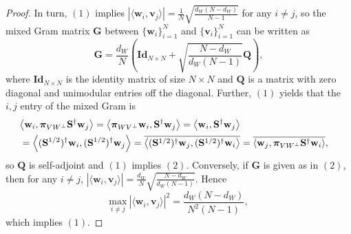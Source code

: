 \documentclass[10pt,a4paper]{amsart}
\newcommand{\bQ}{{\mathbf Q}}
\newcommand{\bS}{{\mathbf S}}
\newcommand{\bpi}{{\boldsymbol{\pi}}}
\newcommand{\bw}{{\mathbf w}}
\newcommand{\ip}[2]{\left\langle#1,#2\right\rangle}
\begin{document}
\begin{proof}
In turn, $(1)$ implies $|\langle \mathbf{w}_i, \mathbf{v}_j \rangle| =  \frac{1}{N}\sqrt{\frac{d_W(N-d_W)}{N-1}}$ for any $i \neq j$, so the mixed Gram matrix $\mathbf{G}$ between $\{\mathbf{w}_i\}_{i=1}^N$ and $\{\mathbf{v}_i\}_{i=1}^N$ can be written as 
    \begin{equation*}
        \mathbf{G} =\frac{d_W}{N} \left(\mathbf{Id}_{N \times N} + \sqrt{\frac{N-d_W}{d_W(N-1)}}\mathbf{Q}\right),
    \end{equation*}
    where $\mathbf{Id}_{N \times N}$ is the identity matrix of size $N \times N$ and $\mathbf{Q}$ is a matrix with zero diagonal and unimodular entries off the diagonal. Further, $(1)$ yields that the $i,j$ entry of the mixed Gram is 
    \begin{align*}
    \lefteqn{\ip{\bw_i}{\bpi_{VW^\perp}\bS^\dagger \bw_j} = \ip{\bpi_{WV^\perp}\bw_i}{\bS^\dagger \bw_j} = \ip{\bw_i}{\bS^\dagger \bw_j}}\\
    &= \ip{(\bS^{1/2})^\dagger\bw_i}{(\bS^{1/2})^\dagger \bw_j} =\overline{\ip{(\bS^{1/2})^\dagger\bw_j}{(\bS^{1/2})^\dagger \bw_i}} =\overline{\ip{\bw_j}{\bpi_{VW^\perp}\bS^\dagger \bw_i}},
    \end{align*}
    so $\bQ$ is self-adjoint and $(1)$ implies  $(2)$. 
Conversely, if $\mathbf{G}$ is given as in $(2)$, then for any $i \neq j$, $ |\langle \mathbf{w}_i, \mathbf{v}_j \rangle| = \frac{d_W}{N}\sqrt{\frac{N-d_W}{d_W(N-1)}}$. Hence
\begin{equation*}
       \underset{i \neq j}{\text{max}} \ |\langle \mathbf{w}_i, \mathbf{v}_j \rangle |^2 = \frac{d_W(N-d_W)}{N^2(N-1)},
    \end{equation*}
    which implies $(1)$. 


\end{proof}
\end{document}
